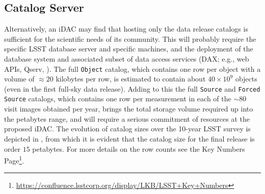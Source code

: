 \subsection{Catalog Server}

Alternatively, an iDAC may find that hosting only the data release catalogs is sufficient for the scientific needs of its community. This will probably require the specific LSST database server  and specific machines, and the deployment of the database system and associated subset of data access services (DAX; e.g., web APIs, Qserv, ). The full {\tt Object} catalog, which contains one row per object with a volume of $\approx 20$ kilobytes per row, is estimated to contain about $40 \times 10^9$ objects (even in the first full-sky data release). Adding to this the full {\tt Source} and {\tt Forced Source} catalogs, which contains one row per measurement in each of the $\sim80$ visit images obtained per year, brings the total storage volume required up into the petabytes range, and will require a serious commitment of resources at the proposed iDAC. The evolution of catalog sizes over the 10-year LSST survey is depicted in , from which it is evident that the catalog size for the final release is order $15$ petabytes. For more details on the row counts see the Key Numbers Page\footnote{\url{https://confluence.lsstcorp.org/display/LKB/LSST+Key+Numbers}}.



